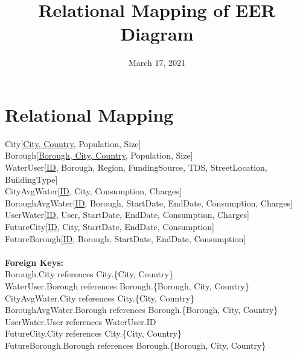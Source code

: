 \documentclass{article}
\title{Relational Mapping of EER Diagram}
\date{March 17, 2021}
\begin{document}
\maketitle


\section{Relational Mapping}
City[\underline{City, Country}, Population, Size] \\
Borough[\underline{Borough, City, Country}, Population, Size] \\
WaterUser[\underline{ID}, Borough, Region, FundingSource, TDS, StreetLocation, BuildingType] \\
CityAvgWater[\underline{ID}, City, Consumption, Charges] \\
BoroughAvgWater[\underline{ID}, Borough, StartDate, EndDate, Consumption, Charges] \\
UserWater[\underline{ID}, User, StartDate, EndDate, Consumption, Charges] \\
FutureCity[\underline{ID}, City, StartDate, EndDate, Consumption] \\
FutureBorough[\underline{ID}, Borough, StartDate, EndDate, Consumption]
\\~\\
\textbf{Foreign Keys:} \\
Borough.City references City.\{City, Country\} \\
WaterUser.Borough references Borough.\{Borough, City, Country\} \\
CityAvgWater.City references City.\{City, Country\} \\
BoroughAvgWater.Borough references Borough.\{Borough, City, Country\} \\
UserWater.User references WaterUser.ID \\
FutureCity.City references City.\{City, Country\} \\
FutureBorough.Borough references Borough.\{Borough, City, Country\} \\
\end{document}
